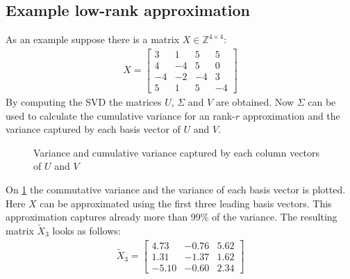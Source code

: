 \subsection{Example low-rank approximation}
As an example suppose there is a matrix \(X \in \mathbb{Z}^{4\times4}\):
\begin{gather}
X = \begin{bmatrix}
3 & 1 & 5 & 5 \\
4 & -4 & 5 & 0 \\
-4 & -2 & -4 & 3 \\
5 & 1 & 5 & -4
\end{bmatrix}
\end{gather}
By computing the SVD the matrices \(U\), \(\Sigma\) and \(V\) are obtained.
Now \(\Sigma\) can be used to calculate the cumulative variance for an rank-\(r\) approximation and the variance captured by each basis vector of \(U\) and \(V\).
\pgfplotsset{width=6cm,compat=1.9}
\begin{figure}[H]
\centering
{}
\label{var-plt}
\caption{Variance and cumulative variance captured by each column vectors of \(U\) and \(V\)}
\end{figure}
On \ref{var-plt} the commutative variance and the variance of each basis vector is plotted.
Here \(X\) can be approximated using the first three leading basis vectors.
This approximation captures already more than 99\% of the variance.
The resulting matrix \(\tilde{X}_3\) looks as follows:
\begin{gather}
\tilde{X}_3 = \begin{bmatrix}
4.73 & -0.76 & 5.62 \\
1.31 & -1.37 & 1.62 \\
-5.10 & -0.60 & 2.34
\end{bmatrix}
\end{gather}




